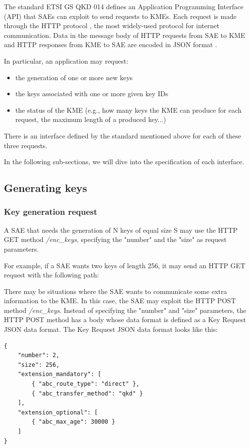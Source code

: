 The standard ETSI GS QKD 014 defines an Application Programming Interface (API) that SAEs can exploit to send requests to KMEs. Each request is made through the HTTP protocol \cite{http}, the most widely-used protocol for internet communication. Data in the message body of HTTP requests from SAE to KME and HTTP responses from KME to SAE are encoded in JSON format \cite{json}.

In particular, an application may request:
\begin{itemize}
    \item the generation of one or more new keys
    \item the keys associated with one or more given key IDs
    \item the status of the KME (e.g., how many keys the KME can produce for each request, the maximum length of a produced key...)
\end{itemize}

There is an interface defined by the standard mentioned above for each of these three requests.

In the following sub-sections, we will dive into the specification of each interface.

\subsection{Generating keys}

\subsubsection{Key generation request}
\label{kme:key_gen}

A SAE that needs the generation of N keys of equal size S may use the HTTP GET method \textit{/enc\_keys}, specifying the "number" and the "size" as request parameters.

For example, if a SAE wants two keys of length 256, it may send an HTTP GET request with the following path:

There may be situations where the SAE wants to communicate some extra information to the KME. In this case, the SAE may exploit the HTTP POST method \textit{/enc\_keys}. Instead of specifying the "number" and "size" parameters, the HTTP POST method has a body whose data format is defined as a Key Request JSON data format. The Key Request JSON data format looks like this:

\begin{verbatim}
{
    "number": 2,
    "size": 256,
    "extension_mandatory": [
        { "abc_route_type": "direct" },
        { "abc_transfer_method": "qkd" }
    ],
    "extension_optional": [
        { "abc_max_age": 30000 }
    ]
}
\end{verbatim}

